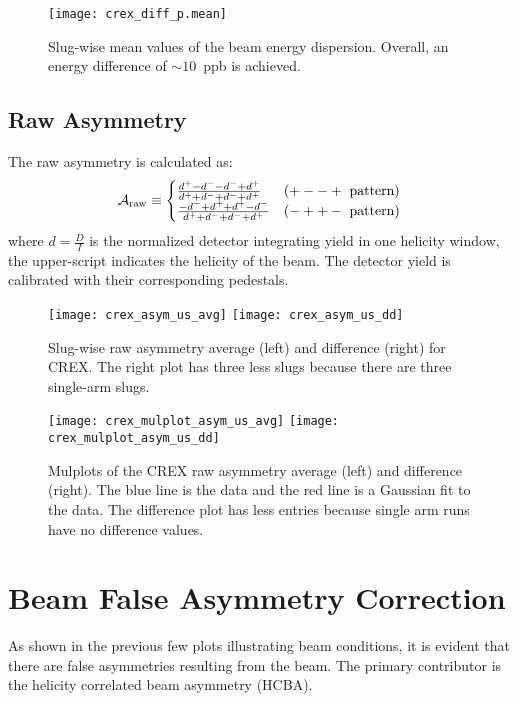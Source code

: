 \begin{figure}[!h]
    \centering
    \texttt{[image: crex\_diff\_p.mean]}
    \caption{Slug-wise mean values of the beam energy dispersion. Overall, 
    an energy difference of $\sim 10$~ppb is achieved. }
    \label{fig:crex_diff_p}
\end{figure}

\subsection{Raw Asymmetry}
The raw asymmetry is calculated as:
\begin{equation}
    \CA_{\text{raw}} \equiv 
    \begin{cases}
	\frac{d^+ - d^- - d^- + d^+}{d^+ + d^- + d^- + d^+}	& (+--+\ \text{pattern})    \\
	\frac{-d^- + d^+ + d^+ - d^-}{d^+ + d^- + d^- + d^+}	& (-++-\ \text{pattern})    \\
    \end{cases}
\end{equation}
where $d=\frac{D}{I}$ is the normalized detector integrating yield in one helicity
window, the upper-script indicates the helicity of the beam. The detector yield is
calibrated with their corresponding pedestals. 
\begin{figure}[!h]
    \centering
    \texttt{[image: crex\_asym\_us\_avg]}
    \texttt{[image: crex\_asym\_us\_dd]}
    \caption{Slug-wise raw asymmetry average (left) and difference (right) for CREX. 
    The right plot has three less slugs because there are three single-arm slugs.}
\end{figure}

\begin{figure}[!h]
    \centering
    \texttt{[image: crex\_mulplot\_asym\_us\_avg]}
    \texttt{[image: crex\_mulplot\_asym\_us\_dd]}
    \caption[Mulplots]
    {Mulplots of the CREX raw asymmetry average (left) and difference (right). 
    The blue line is the data and the red line is a Gaussian fit to the data. 
    The difference plot has less entries because single arm runs have no difference values.}
\end{figure}


\section{Beam False Asymmetry Correction}
As shown in the previous few plots illustrating beam conditions, it is evident
that there are false asymmetries resulting from the beam. The primary contributor
is the helicity correlated beam asymmetry (HCBA).

